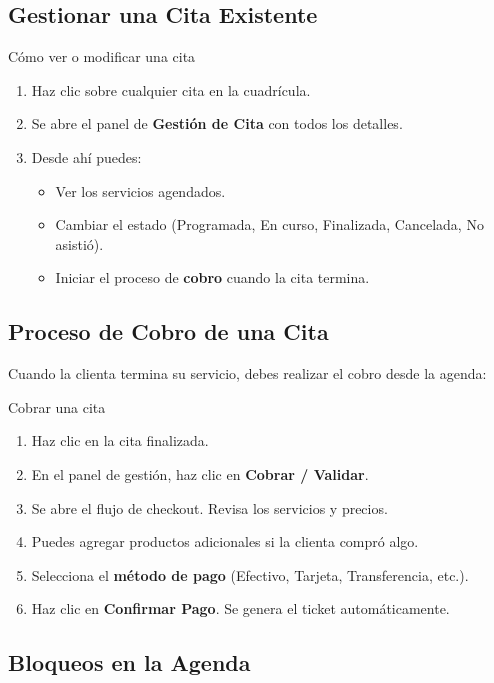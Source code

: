 \documentclass[12pt,a4paper]{article}
\begin{document}
\subsection{Gestionar una Cita Existente}

\begin{pasobox}{Cómo ver o modificar una cita}
\begin{enumerate}[leftmargin=*]
  \item Haz clic sobre cualquier cita en la cuadrícula.
  \item Se abre el panel de \textbf{Gestión de Cita} con todos los detalles.
  \item Desde ahí puedes:
  \begin{itemize}
    \item Ver los servicios agendados.
    \item Cambiar el estado (Programada, En curso, Finalizada, Cancelada, No asistió).
    \item Iniciar el proceso de \textbf{cobro} cuando la cita termina.
  \end{itemize}
\end{enumerate}
\end{pasobox}

\subsection{Proceso de Cobro de una Cita}

Cuando la clienta termina su servicio, debes realizar el cobro desde la agenda:

\begin{pasobox}{Cobrar una cita}
\begin{enumerate}[leftmargin=*]
  \item Haz clic en la cita finalizada.
  \item En el panel de gestión, haz clic en \textbf{Cobrar / Validar}.
  \item Se abre el flujo de checkout. Revisa los servicios y precios.
  \item Puedes agregar productos adicionales si la clienta compró algo.
  \item Selecciona el \textbf{método de pago} (Efectivo, Tarjeta, Transferencia, etc.).
  \item Haz clic en \textbf{Confirmar Pago}. Se genera el ticket automáticamente.
\end{enumerate}
\end{pasobox}

\subsection{Bloqueos en la Agenda}
\end{document}
